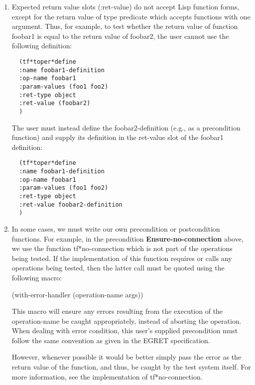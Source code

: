 \begin {enumerate}
\small\begin{verbatim}
    (tf*tpre*define
    :name foobar-definition
    :op-name foobar
    :param-values (foo1 foobar2-definition)
    ..
    )
\end{verbatim}\normalsize


\small\begin{verbatim}
    (tf*tpre*define
    :name foobar2-definition
    :op-name foobar2
    :param-values (foo3)
    ..
    )
\end{verbatim}\normalsize

\item Expected return value slots (:ret-value) do not accept 
Lisp function forms, except for the return value of type predicate
which accepts functions with one argument.  Thus, for example, to
test whether the return value of function foobar1 is equal to the
return value of foobar2, the user cannot use the following definition:
\small\begin{verbatim}
  (tf*toper*define
  :name foobar1-definition
  :op-name foobar1
  :param-values (foo1 foo2)
  :ret-type object
  :ret-value (foobar2)
  )
\end{verbatim}\normalsize
The user must instead define the foobar2-definition (e.g., as a precondition
function) and supply
its definition in the ret-value slot of the foobar1 definition:
\small\begin{verbatim}
  (tf*toper*define
  :name foobar1-definition
  :op-name foobar1
  :param-values (foo1 foo2)
  :ret-type object
  :ret-value foobar2-definition
  )
\end{verbatim}\normalsize


\item In some cases,  we must write our own precondition or postcondition 
functions.
For example, in the precondition {\bf Ensure-no-connection} above, 
we use the function tf*no-connection which is not part of the operations
being tested. If the implementation of this function requires or calls
any operations being tested, then the latter call must be quoted
using the following macro:

(with-error-handler (operation-name args))\

This macro will ensure any errors resulting from the execution of the
operation-name be caught appropriately, instead of aborting
the operation.  
When dealing with error condition, this user's supplied precondition
must follow the same convention  as given in the EGRET specification.

However, whenever possible it would be better simply pass the error as 
the return value of the function, and thus,  be caught by the test system 
itself. For more  information, see the implementation of tf*no-connection.
\end{enumerate}


